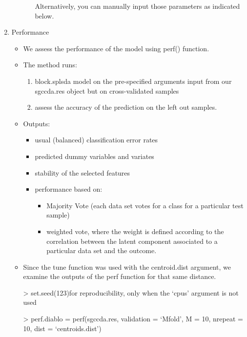 \documentclass[
]{book}
\begin{document}
\begin{enumerate}
\begin{itemize}
\begin{itemize}
      Alternatively, you can manually input those parameters as indicated below.
    \end{itemize}
  \end{itemize}
\item
  Performance

  \begin{itemize}
  \item
    We assess the performance of the model using perf() function.
  \item
    The method runs:

    \begin{enumerate}
    \def\labelenumii{\arabic{enumii}.}
    \item
      block.splsda model on the pre-specified arguments input from our sgccda.res object but on cross-validated samples
    \item
      assess the accuracy of the prediction on the left out samples.
    \end{enumerate}
  \item
    Outputs:

    \begin{itemize}
    \item
      usual (balanced) classification error rates
    \item
      predicted dummy variables and variates
    \item
      stability of the selected features
    \item
      performance based on:

      \begin{itemize}
      \item
        Majority Vote (each data set votes for a class for a particular test sample)
      \item
        weighted vote, where the weight is defined according to the correlation between the latent component associated to a particular data set and the outcome.
      \end{itemize}
    \end{itemize}
  \item
    Since the tune function was used with the centroid.dist argument, we examine the outputs of the perf function for that same distance.

    \textgreater{} set.seed(123)for reproducibility, only when the `cpus' argument is not used

    \textgreater{} perf.diablo = perf(sgccda.res, validation = `Mfold', M = 10, nrepeat = 10, dist = `centroids.dist')


\end{itemize}
\end{enumerate}
\end{document}
